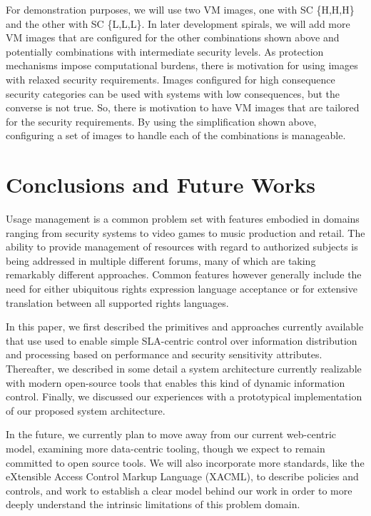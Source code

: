 \documentclass{sig-alternate}
\begin{document}
For demonstration purposes, we will use two VM images, one with SC \{H,H,H\} and the other with SC \{L,L,L\}.  In later development spirals, we will add more VM images that are configured  for the other combinations shown above and potentially combinations with intermediate security levels.  As protection mechanisms impose computational burdens, there is motivation for using images with relaxed security requirements. Images configured for high consequence security categories can be used with systems with low consequences, but the converse is not true.  So, there is motivation to have VM images that are tailored for the security requirements.  By using the simplification shown above, configuring a set of images to handle each of the combinations is manageable. 

\section{Conclusions and Future Works}
Usage management is a common problem set with features embodied in domains ranging from security systems to video games to music production and retail.  The ability to provide management of resources with regard to authorized subjects is being addressed in multiple different forums, many of which are taking remarkably different approaches.  Common features however generally include the need for either ubiquitous rights expression language acceptance or for extensive translation between all supported rights languages.

In this paper, we first described the primitives and approaches currently available that use used to enable simple SLA-centric control over information distribution and processing based on performance and security sensitivity attributes.  Thereafter, we described in some detail a system architecture currently realizable with modern open-source tools that enables this kind of dynamic information control.  Finally, we discussed our experiences with a prototypical implementation of our proposed system architecture.

In the future, we currently plan to move away from our current web-centric model, examining more data-centric tooling, though we expect to remain committed to open source tools.  We will also incorporate more standards, like the eXtensible Access Control Markup Language (XACML), to describe policies and controls, and work to establish a clear model behind our work in order to more deeply understand the intrinsic limitations of this problem domain.



\end{document}
